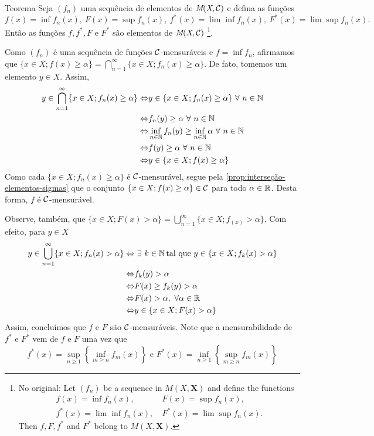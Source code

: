 \begin{env}{Teorema}
\label{teo:mensurabilidade-sequencia-funcoes-mensuraveis}
	Seja $(f_n)$ uma sequência de elementos de $\operatorname{\textit{M}(\textit{X}, \mathcal{C} )}$ e defina as funções
	$$f(x) = \inf f_n(x),\  
	F(x) = \sup f_n(x),\  
	f^*(x) = \lim\inf f_n(x),\   
	F^*(x) = \lim\sup f_n(x).$$
	Então as funções $f, f^*, F$ e $F^*$ são elementos de $\operatorname{\textit{M}(\textit{X}, \mathcal{C} )}$
	\cite[p. 12, tradução nossa, adaptação nossa]{bartle}
	\footnote{No original: 
		Let $(f_n)$ be a sequence in $M(X, \textbf{X})$ and define the functions
		\begin{align*}
			f(x) = \inf f_n(x),\ & 
			F(x) = \sup f_n(x),\\
			f^*(x) = \lim \inf f_n(x),\ & 
			F^*(x) = \lim \sup f_n(x).
		\end{align*}
		Then $f, F, f^*$ and $F^*$ belong to $M(X, \textbf{X})$.}.
\end{env}
\begin{prova}
	Como $(f_n)$ é uma sequência de funções $\operatorname{\mathcal{C}}$-mensuráveis e $f = \inf f_n$, afirmamos que $\{x \in X; f(x) \geq \alpha\} = \displaystyle \bigcap_{n = 1}^\infty \{x \in X; f_n(x) \geq \alpha\}$.
	De fato, tomemos um elemento $y \in X$.
	Assim, 
		\begin{align*}
			y \in \bigcap_{n = 1}^\infty \{x \in X; f_n(x) \geq \alpha\} \Leftrightarrow	&
			y \in \{x \in X; f_n(x) \geq \alpha\}\ \forall\  n \in \N\\
			\Leftrightarrow	&	
			f_n(y) \geq \alpha\ \forall \ n \in \N\\
			\Leftrightarrow	&	
			\inf_{n \in \N}f_n(y) \geq \inf_{n \in \N}\alpha\ \forall \ n \in \N\\
			\Leftrightarrow	&	
			f(y) \geq \alpha\ \forall\  n \in \N\\
			\Leftrightarrow	&
			y \in \{x \in X; f(x) \geq \alpha\}
		\end{align*}
	Como cada $\{x \in X; f_n(x) \geq \alpha\}$ é $\operatorname{\mathcal{C}}$-mensurável, segue pela \ref{prop:interseção-elementos-sigmas} que o conjunto $\{x \in X; f(x) \geq \alpha\} \in \operatorname{\mathcal{C}}$ para todo $\alpha \in \mathbb{R}$.
	Desta forma, $f$ é $\operatorname{\mathcal{C}}$-mensurável.
	
	Observe, também, que $\{x \in X; F(x) >\alpha\} = \displaystyle \bigcup_{n = 1}^\infty \{x \in X; f_(x) >\alpha\}$.
	Com efeito, para $y \in X$ 
	\begin{align*}
		y \in \bigcup_{n = 1}^\infty \{x \in X; f_n(x) > \alpha\} \Leftrightarrow	&
		\ \exists\ k \in \operatorname{\mathbb{N}} \textrm{tal que\ } y \in \{x \in X; f_k(x) > \alpha\}\\
		\Leftrightarrow	&	
		f_k(y) > \alpha\\
		\Leftrightarrow	&	
		F(x) \geq f_k(y) > \alpha\\
		\Leftrightarrow	&	
		F(x) > \alpha,\ \forall \alpha \in \mathbb{R}\\
		\Leftrightarrow	&
		y \in \{x \in X; F(x) > \alpha\}
	\end{align*}
	Assim, concluímos que $f$ e $F$ são $\operatorname{\mathcal{C}}$-mensuráveis. 
	Note que a mensurabilidade de $f^*$ e $F^*$ vem de $f$ e $F$ uma vez que
	$$
	f^*(x) = \sup_{n \geq 1} \left\{\inf_{m \geq n} f_m(x)\right\}
	\textrm{\ e\ }
	F^*(x) = \inf_{n \geq 1} \left\{\sup_{m \geq n} f_m(x)\right\}
	$$
\end{prova}

